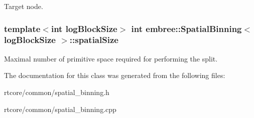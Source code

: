 Target node. 

\hypertarget{classembree_1_1_spatial_binning_a32adb1161fa055c1ad51a625ca56ca92}{
\subsubsection[{spatialSize}]{\setlength{\rightskip}{0pt plus 5cm}template$<$int logBlockSize$>$ int {\bf embree::SpatialBinning}$<$ logBlockSize $>$::{\bf spatialSize}}}
\label{classembree_1_1_spatial_binning_a32adb1161fa055c1ad51a625ca56ca92}


Maximal number of primitive space required for performing the split. 



The documentation for this class was generated from the following files:\begin{DoxyCompactItemize}
\item 
rtcore/common/spatial\_\-binning.h\item 
rtcore/common/spatial\_\-binning.cpp\end{DoxyCompactItemize}
